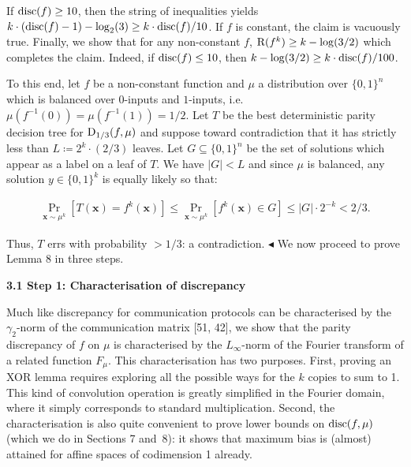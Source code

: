 If ${\textup{disc}}(f)\geq 10$, then the string of inequalities yields $k\cdot({\textup{disc}}(f)-1)-\log_{2}(3)\geq k\cdot{\textup{disc}}(f)/10$. If $f$ is constant, the claim is vacuously true. Finally, we show that for any non-constant $f$, ${\textup{R}}(f^{k})\geq k-\log(3/2)$ which completes the claim. Indeed, if ${\textup{disc}}(f)\leq 10$, then $k-\log(3/2)\geq k\cdot{\textup{disc}}(f)/100$.\par




To this end, let $f$ be a non-constant function and $\mu$ a distribution over $\{0,1\}^{n}$ which is balanced over $0$-inputs and $1$-inputs, i.e. $\mu(f^{-1}(0))=\mu(f^{-1}(1))=1/2$. Let $T$ be the best deterministic parity decision tree for ${\textup{D}}_{1/3}(f,\mu)$ and suppose toward contradiction that it has strictly less than $L\coloneqq 2^{k}\cdot(2/3)$ leaves. Let $G\subseteq\{0,1\}^{n}$ be the set of solutions which appear as a label on a leaf of $T$. We have $|G|<L$ and since $\mu$ is balanced, any solution $y\in\{0,1\}^{k}$ is equally likely so that:\par


\[\begin{gathered}
\Pr_{\bm{x}\sim\mu^{k}}[T(\bm{x})=f^{k}(\bm{x})]\leq\Pr_{\bm{x}\sim\mu^{k}}[f^{k}(\bm{x})\in G]\leq|G|\cdot 2^{-k}<2/3.
\end{gathered}\]


Thus, $T$ errs with probability $>1/3$: a contradiction.
$\blacktriangleleft$
We now proceed to prove Lemma 8 in three steps.\par





\par\medskip\noindent\textbf{
3.1 Step 1: Characterisation of discrepancy}\par




Much like discrepancy for communication protocols can be characterised by the $\gamma_{2}$-norm of the communication matrix [51, 42], we show that the parity discrepancy of $f$ on $\mu$ is characterised by the $L_{\infty}$-norm of the Fourier transform of a related function $F_{\mu}$. This characterisation has two purposes. First, proving an XOR lemma requires exploring all the possible ways for the $k$ copies to sum to 1. This kind of convolution operation is greatly simplified in the Fourier domain, where it simply corresponds to standard multiplication. Second, the characterisation is also quite convenient to prove lower bounds on ${\textup{disc}}(f,\mu)$ (which we do in Sections 7 and 8): it shows that maximum bias is (almost) attained for affine spaces of codimension 1 already.\par




